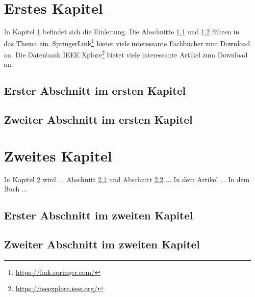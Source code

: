 \documentclass[12pt,a4paper,final]{scrbook}
\begin{document}
	
\chapter{Erstes Kapitel}\label{chap:eins}
In Kapitel \ref{chap:eins} befindet sich die Einleitung. 
Die Abschnitte \ref{sec:einsA} und \ref{sec:einsB} führen in das Thema ein. 
SpringerLink\footnote{\url{https://link.springer.com/}} bietet viele interessante Fachbücher zum Download an. 
Die Datenbank IEEE Xplore\footnote{\url{https://ieeexplore.ieee.org/}} bietet viele interessante Artikel zum Download an. 
\section{Erster Abschnitt im ersten Kapitel}\label{sec:einsA}
\blindtext
\section{Zweiter Abschnitt im ersten Kapitel}\label{sec:einsB}
\blindtext

\chapter{Zweites Kapitel}\label{chap:zwei}
In Kapitel \ref{chap:zwei} wird ...
Abschnitt \ref{sec:zweiA} und Abschnitt \ref{sec:zweiB} ...
In dem Artikel \cite{linuxcncrte} ...
In dem Buch \cite{computernetze} ...
\section{Erster Abschnitt im zweiten Kapitel}\label{sec:zweiA}
\blindtext
\section{Zweiter Abschnitt im zweiten Kapitel}\label{sec:zweiB}
\blindtext

\printbibliography
\end{document}
